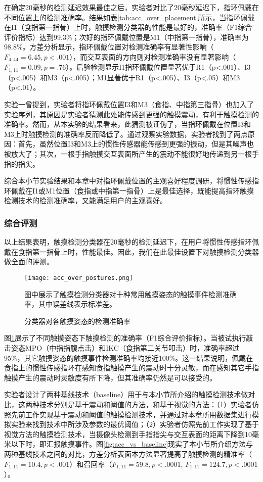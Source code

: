 在确定20毫秒的检测延迟效果最佳之后，实验者对比了20毫秒延迟下，指环佩戴在不同位置上的检测准确率。结果如表\ref{tab:acc_over_placement}所示，当指环佩戴在I1（食指第一指骨）上时，触摸检测分类器的性能是最好的，准确率（F1综合评价指标）达到99.3\%；次好的指环佩戴位置是M1（中指第一指骨），准确率为98.8\%。方差分析显示，指环佩戴位置对检测准确率有显著性影响（$F_{4,44}=6.45,p<.001$），而交互表面的方向则对检测准确率没有显著影响（$F_{1,11}=0.09,p=.76$）。后验检测显示I1指环佩戴位置显著优于R1（p<.001）、I3（p<.005）和M3（p<.005）；M1显著优于R1（p<.005）、I3（p<.05）和M3（p<.01）。

实验一曾提到，实验者将指环佩戴位置I3和M3（食指、中指第三指骨）也加入了实验序列，其原因是实验者猜测此处能传感到更强的触摸震动，有利于触摸检测的准确率。然而，从本实验的结果看来，此猜测被证伪了，当指环佩戴在位置I3和M3上时触摸检测的准确率反而降低了。通过观察实验数据，实验者找到了两点原因：首先，虽然位置I3和M3上的惯性传感器能传感到更强的振动，但是其噪声也被放大了；其次，一根手指触摸交互表面所产生的震动不能很好地传递到另一根手指的指尖。

综合本小节实验结果和本章中对指环佩戴位置的主观喜好程度调研，将惯性传感指环佩戴在I1或M1位置（食指或中指第一指骨）上是最佳选择，既能提高指环触摸检测技术的检测准确率，又能满足用户的主观喜好。

\subsubsection{综合评测}

以上结果表明，触摸检测分类器在20毫秒的检测延迟下，在用户将惯性传感指环佩戴在食指第一指骨上时，性能最佳。因此，我们在此最佳设置下对触摸检测分类器做全面的评测。

\begin{figure}
	\centering
	\texttt{[image: acc\_over\_postures.png]}
	\caption*{图中展示了触摸检测分类器对十种常用触摸姿态的触摸事件检测准确率，其中误差线表示标准差。}
	\caption{分类器对各触摸姿态的检测准确率}
	\label{fig:acc_over_postures}
\end{figure}

图\ref{fig:acc_over_postures}展示了不同触摸姿态下触摸检测的准确率（F1综合评价指标）。当被试执行敲击姿态MPO（中指指腹点击）和IKC（食指第二关节叩击）时，准确率超过95\%，其它触摸姿态的触摸事件检测准确率均接近100\%。这一结果说明，佩戴在食指上的惯性传感指环在感知食指触摸产生的震动时十分灵敏，而在感知其它手指触摸产生的震动时灵敏度有所下降，但其准确率仍然是可以接受的。

实验者设计了两种基线技术（baseline）用于与本小节所介绍的触摸检测技术做对比，这两种技术分别是基于震动和阈值的方法，和基于视觉的方法：（1）实验者仿照先前工作\cite{lam2002mids, oh2017anywheretouch}实现基于震动和阈值的触摸检测技术，并通过对本章所用数据集进行模拟实验来找到技术中所涉及参数的最优阈值；（2）实验者仿照先前工作\cite{newcombe2011kinectfusion, wilson2010combining, xiao2016direct, xiao2018mrtouch}实现了基于视觉方法的触摸检测技术，当摄像头检测到手指指尖与交互表面的距离下降到10毫米以下时，即汇报触摸事件。图\ref{fig:acc_vs_baseline}现实了本小节所介绍方法与两种基线技术之间的对比，方差分析表面本方法显著提高了触摸检测的精准率（$F_{1,11}=10.4,p<.001$）和召回率（$F_{1,11}=59.8,p<.0001$, $F_{1,11}=124.7,p<.0001$）。


